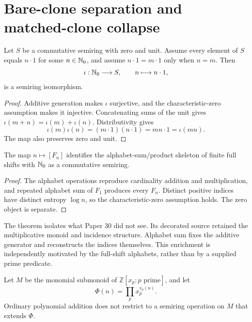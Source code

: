 \section{Bare-clone separation and matched-clone collapse}
\label{sec:semiring-clones}

\begin{theorem}
\label{thm:additive-reconstruction}
Let $S$ be a commutative semiring with zero and unit.  Assume every element of
$S$ equals $n\cdot1$ for some $n\in\mathbb N_0$, and assume
$n\cdot1=m\cdot1$ only when $n=m$.  Then
\[
  \iota:\mathbb N_0\longrightarrow S,
  \qquad n\longmapsto n\cdot1,
\]
is a semiring isomorphism.
\end{theorem}

\begin{proof}
Additive generation makes $\iota$ surjective, and the characteristic-zero
assumption makes it injective.  Concatenating sums of the unit gives
$\iota(m+n)=\iota(m)+\iota(n)$.  Distributivity gives
\[
  \iota(m)\iota(n)=(m\cdot1)(n\cdot1)=mn\cdot1=\iota(mn).
\]
The map also preserves zero and unit.
\end{proof}

\begin{corollary}
The map $n\mapsto[F_n]$ identifies the alphabet-sum/product skeleton of finite
full shifts with $\mathbb N_0$ as a commutative semiring.
\end{corollary}

\begin{proof}
The alphabet operations reproduce cardinality addition and multiplication,
and repeated alphabet sum of $F_1$ produces every $F_n$.  Distinct positive
indices have distinct entropy $\log n$, so the characteristic-zero assumption
holds.  The zero object is separate.
\end{proof}

The theorem isolates what Paper 30 did not see.  Its decorated source retained
the multiplicative monoid and incidence structure.  Alphabet sum fixes the
additive generator and reconstructs the indices themselves.  This enrichment
is independently motivated by the full-shift alphabets, rather than by a
supplied prime predicate.

\begin{proposition}
\label{prop:bare-clone}
Let $M$ be the monomial submonoid of
$\mathbb Z[x_p:p\text{ prime}]$, and let
\[
  \Phi(n)=\prod_p x_p^{v_p(n)}.
\]
Ordinary polynomial addition does not restrict to a semiring operation on $M$
that extends $\Phi$.
\end{proposition}

